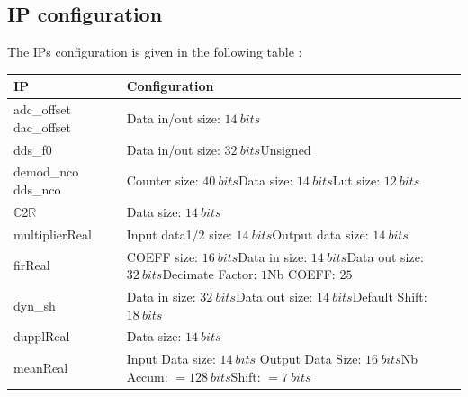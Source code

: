 \documentclass[12pt,oneside]{article}
\begin{document}
\vspace{0.4cm}
\subsection{IP configuration}
\vspace{0.4cm}
The IPs configuration is given in the following table :
\vspace{0.6cm}
\begin{center}
	\begin{tabular}{|>{\centering\arraybackslash}m{.3\linewidth} | >{\centering\arraybackslash}m{.3\linewidth} |}
		\hline
		IP & Configuration \\
		\hline
		\hspace{0.65cm} adc\_offset \newline dac\_offset&Data in/out size: $14~bits$\\
		\hdashline
		dds\_f0& Data in/out size: $32~bits$\newline Unsigned\\
		\hline
		\hspace{0.55cm} demod\_nco \newline dds\_nco & Counter size: $40~bits$\newline Data size: $14~bits$\newline Lut size: $12~bits$\\
		\hline
		$\mathbb{C}$2$\mathbb{R}$& Data size: $14~bits$\\
		\hline
		multiplierReal& Input data1/2 size: $14~bits$\newline Output data size: $14~bits$\\
		\hline
		firReal& COEFF size: $16~bits$\newline Data in size: $14~bits$\newline Data out size: $32~bits$\newline Decimate Factor: $1$\newline Nb COEFF: $25$\\
		\hline
		dyn\_sh& Data in size: $32~bits$\newline Data out size: $14~bits$\newline Default Shift: $18~bits$\\
		\hline
		dupplReal& Data size: $14~bits$\\
		\hline
		meanReal&Input Data size: $14~bits$ \newline Output Data Size: $16~bits$\newline Nb Accum: $=128~bits$\newline Shift: $=7~bits$\\
		\hline
		\end{tabular}


\end{center}
\end{document}
